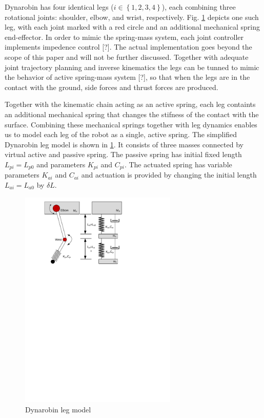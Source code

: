 

Dynarobin has four identical legs ($i\in \left \{ 1,2,3,4 \right \}$), each combining three rotational joints: shoulder, elbow, and wrist, respectively. Fig. \ref{fig:DynarobinLEG} depicts one such leg, with each joint marked with a red circle and an additional mechanical spring end-effector. In order to mimic the spring-mass system, each joint controller implements impedence control [?]. The actual implementation goes beyond the scope of this paper and will not be further discussed. Together with adequate joint trajectory planning and inverse kinematics the legs can be tunned to mimic the behavior of active spring-mass system [?], so that when the legs are in the contact with the ground, side forces and thrust forces are produced.

Together with the kinematic chain acting as an active spring, each leg containts an additional mechanical spring that changes the stifness of the contact with the surface. Combining these mechanical springs together with leg dynamics enables us to model each leg of the robot as a single, active spring. The simplified Dynarobin leg model is shown in \ref{fig:DynarobinLEG}. It consists of three masses connected by virtual active and passive spring. The passive spring has initial fixed length $L_{pi}=L_{p0}$ and parameters $K_{pi}$ and $C_{pi}$.  The actuated spring has variable parameters $K_{ai}$ and $C_{ai}$ and actuation is provided by changing the initial length $L_{ai}=L_{a0}$ by $\delta L$.
\begin{figure}
	\centering
	\includegraphics[width=75mm]{./pictures/Dynarobin_leg.pdf}
	\caption{Dynarobin leg model}
	\label{fig:DynarobinLEG}
\end{figure}
